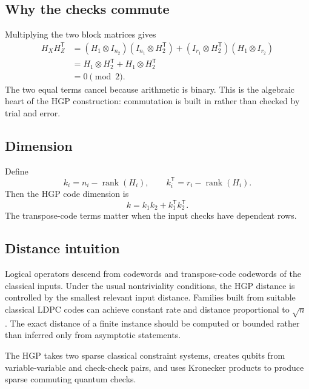 \documentclass[11pt,letterpaper]{article}
\newcommand{\rank}{\operatorname{rank}}
\begin{document}
\subsection{Why the checks commute}

Multiplying the two block matrices gives
\begin{align}
H_XH_Z^{\mathsf T}
&=(H_1\otimes I_{n_2})(I_{n_1}\otimes H_2^{\mathsf T})
 +(I_{r_1}\otimes H_2^{\mathsf T})(H_1\otimes I_{r_2})\\
&=H_1\otimes H_2^{\mathsf T}+H_1\otimes H_2^{\mathsf T}\\
&=0\pmod 2.
\end{align}
The two equal terms cancel because arithmetic is binary. This is the algebraic heart of the HGP
construction: commutation is built in rather than checked by trial and error.

\subsection{Dimension}

Define
\begin{equation}
  k_i=n_i-\rank(H_i),\qquad k_i^{\mathsf T}=r_i-\rank(H_i).
\end{equation}
Then the HGP code dimension is
\begin{equation}
  k=k_1k_2+k_1^{\mathsf T}k_2^{\mathsf T}.
  \label{eq:hgp-k}
\end{equation}
The transpose-code terms matter when the input checks have dependent rows.

\subsection{Distance intuition}

Logical operators descend from codewords and transpose-code codewords of the classical inputs.
Under the usual nontriviality conditions, the HGP distance is controlled by the smallest relevant
input distance. Families built from suitable classical LDPC codes can achieve constant rate and
distance proportional to $\sqrt n$ \cite{tillich-zemor}. The exact distance of a finite instance
should be computed or bounded rather than inferred only from asymptotic statements.

\begin{keyidea}
The HGP takes two sparse classical constraint systems, creates qubits from variable-variable and
check-check pairs, and uses Kronecker products to produce sparse commuting quantum checks.
\end{keyidea}
\end{document}
